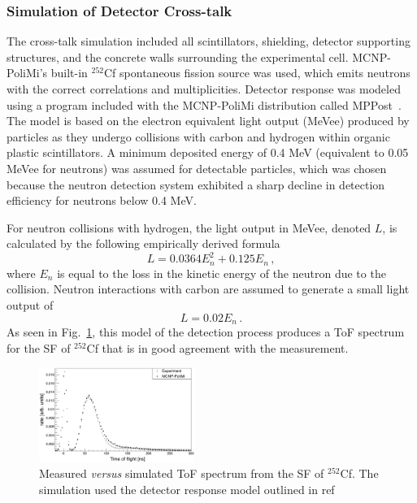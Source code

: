 \documentclass[%
 reprint,
 amsmath,amssymb,
 aps,
 nofootinbib
]{revtex4-1}
\begin{document}
\subsubsection{Simulation of Detector Cross-talk}
The cross-talk simulation included all scintillators, shielding, detector supporting structures, and the concrete walls surrounding the experimental cell.
MCNP-PoliMi's built-in $^{252}$Cf spontaneous fission source was used, which emits neutrons with the correct correlations and multiplicities.
Detector response was modeled using a program included with the MCNP-PoliMi distribution called MPPost~\cite{MPPost}.
The model is based on the electron equivalent light output (MeVee) produced by particles as they undergo collisions with carbon and hydrogen within organic plastic scintillators.
A minimum deposited energy of 0.4 MeV (equivalent to 0.05 MeVee for neutrons) was assumed for detectable particles, which was chosen because the neutron detection system exhibited a sharp decline in detection efficiency for neutrons below 0.4 MeV.

For neutron collisions with hydrogen, the light output in MeVee, denoted $L$, is calculated by the following empirically derived formula
\begin{displaymath}
L = 0.0364 E_n^2 +  0.125 E_n \, ,
\end{displaymath}
where $E_n$ is equal to the loss in the kinetic energy of the neutron due to the collision.
Neutron interactions with carbon are assumed to generate a small light output of
\begin{displaymath}
L = 0.02 E_n \, .
\end{displaymath}
As seen in Fig.~\ref{fig:Cf252MCNPVsEXP}, this model of the detection process produces a ToF spectrum for the SF of $^{252}$Cf that is in good agreement with the measurement.
\begin{figure}
    \centering
    \includegraphics[width = 0.45\textwidth]{Cf252MCNPVsEXP.png}
    \caption{Measured \emph{versus} simulated ToF spectrum from the SF of $^{252}$Cf.
        The simulation used the detector response model outlined in ref~\cite{MPPost}}
    \label{fig:Cf252MCNPVsEXP}
\end{figure}
\end{document}
